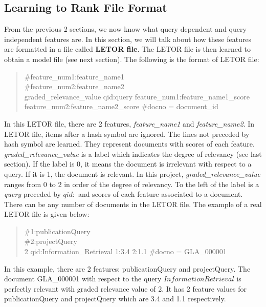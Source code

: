 \subsection{Learning to Rank File Format}\label{sec:letorFile}
From the previous 2 sections, we now know what query dependent and query independent features are. In this section, we will talk about how these features
are formatted in a file called \textbf{LETOR file}. The LETOR file is then learned to obtain a model file (see next section).
The following is the format of LETOR file:

\begin{quotation}
\noindent\#feature\_num1:feature\_name1 \\
\#feature\_num2:feature\_name2 \\
graded\_relevance\_value qid:query feature\_num1:feature\_name1\_score feature\_num2:feature\_name2\_score \#docno = document\_id
\end{quotation}

In this LETOR file, there are 2 features, \textit{feature\_name1} and \textit{feature\_name2}. In LETOR file, items after a hash symbol are ignored.
The lines not preceded by hash symbol are learned. They represent documents with scores
of each feature. \textit{graded\_relevance\_value} is a label which indicates the degree of relevancy (see last section).
If the label is 0, it means the document is irrelevant with respect to a query. If it is 1, the document is relevant. 
In this project, \textit{graded\_relevance\_value} ranges from 0 to 2 in order of 
the degree of relevancy. To the left of the label is a \textit{query} preceded by \textit{$qid:$} and scores of each feature associated to a document.
There can be any number of documents in the LETOR file. The example of a real LETOR file is given below:

\begin{quotation}
\noindent\#1:publicationQuery \\
\#2:projectQuery \\
2 qid:Information\_Retrieval 1:3.4 2:1.1 \#docno = GLA\_000001
\end{quotation}

In this example, there are 2 features: publicationQuery and projectQuery. The document GLA\_000001 with respect to the query $Information Retrieval$
is perfectly relevant with graded relevance value of 2. It has 2 feature values for publicationQuery and projectQuery which are 3.4 and 1.1 respectively.

